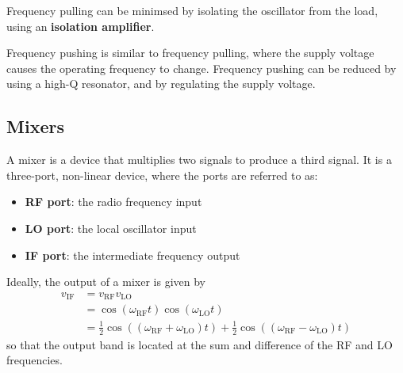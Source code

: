 \documentclass{article}
\begin{document}
Frequency pulling can be minimsed by isolating the oscillator from the
load, using an \textbf{isolation amplifier}.

Frequency pushing is similar to frequency pulling, where the supply
voltage causes the operating frequency to change. Frequency pushing can
be reduced by using a high-Q resonator, and by regulating the supply
voltage.
\subsection{Mixers}
A mixer is a device that multiplies two signals to produce a third
signal. It is a three-port, non-linear device, where the ports are
referred to as:
\begin{itemize}
    \item \textbf{RF port}: the radio frequency input
    \item \textbf{LO port}: the local oscillator input
    \item \textbf{IF port}: the intermediate frequency output
\end{itemize}
Ideally, the output of a mixer is given by
\begin{align*}
    v_{\mathrm{IF}} & = v_{\mathrm{RF}} v_{\mathrm{LO}}                                                                                                                                                               \\
                    & = \cos{\left( \omega_{\mathrm{RF}} t \right)} \cos{\left( \omega_{\mathrm{LO}} t \right)}                                                                                                       \\
                    & = \frac{1}{2} \cos{\left( \left( \omega_{\mathrm{RF}} + \omega_{\mathrm{LO}} \right) t \right)} + \frac{1}{2} \cos{\left( \left( \omega_{\mathrm{RF}} - \omega_{\mathrm{LO}} \right) t \right)}
\end{align*}
so that the output band is located at the sum and difference of the
RF and LO frequencies.
\end{document}
